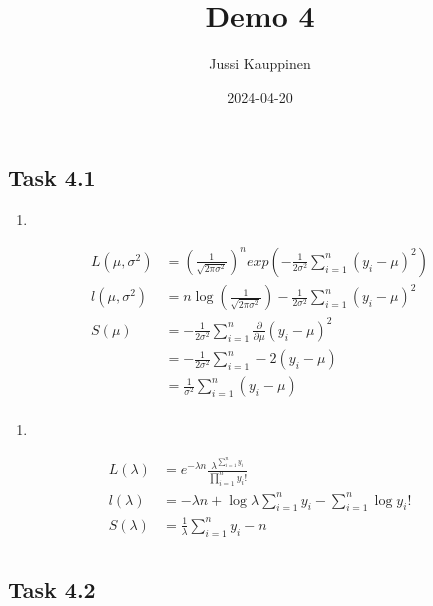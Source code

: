 \documentclass[
]{article}
\title{Demo 4}
\author{Jussi Kauppinen}
\date{2024-04-20}
\providecommand{\tightlist}{%
  \setlength{\itemsep}{0pt}\setlength{\parskip}{0pt}}
\begin{document}
\maketitle

\hypertarget{task-4.1}{%
\subsection{Task 4.1}\label{task-4.1}}

\begin{enumerate}
\def\labelenumi{\alph{enumi})}
\tightlist
\item
\end{enumerate}

\begin{equation}
\begin{split}
L(\mu, \sigma^2) &= \left(\frac{1}{\sqrt{2\pi\sigma^2}}\right)^n exp(-\frac{1}{2\sigma^2} \sum_{i=1}^n (y_i - \mu)^2)\\
l(\mu, \sigma^2) &= n \log \left( \frac{1}{\sqrt{2\pi\sigma^2}} \right) - \frac{1}{2\sigma^2} \sum_{i=1}^n (y_i - \mu)^2\\
S(\mu) &= - \frac{1}{2\sigma^2} \sum_{i=1}^n \frac{\partial}{\partial \mu} (y_i - \mu)^2\\
&= - \frac{1}{2\sigma^2} \sum_{i=1}^n -2(y_i - \mu)\\
&= \frac{1}{\sigma^2} \sum_{i=1}^n (y_i - \mu)\\
\end{split}
\end{equation}

\begin{enumerate}
\def\labelenumi{\alph{enumi})}
\setcounter{enumi}{1}
\tightlist
\item
\end{enumerate}

\begin{equation}
\begin{split}
L(\lambda) &= e^{-\lambda n} \frac{\lambda^{\sum_{i=1}^n y_i}}{\prod_{i=1}^n y_i !}\\
l(\lambda) &= -\lambda n + \log \lambda \sum_{i=1}^n y_i - \sum_{i=1}^n \log y_i !\\
S(\lambda) &= \frac{1}{\lambda} \sum_{i=1}^n y_i - n\\
\end{split}
\end{equation}

\hypertarget{task-4.2}{%
\subsection{Task 4.2}\label{task-4.2}}
\end{document}
